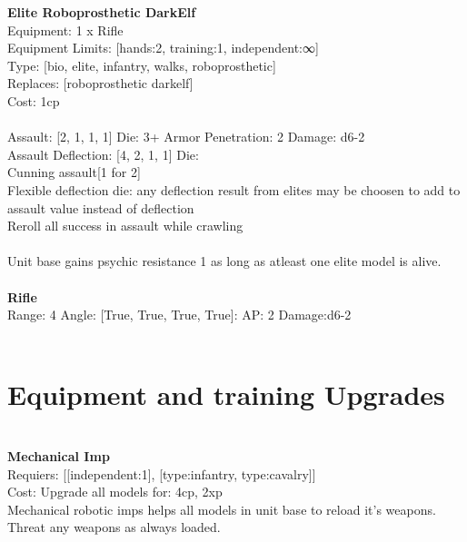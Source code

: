 {\bf Elite Roboprosthetic DarkElf } \\
Equipment: 1 x Rifle \\
Equipment Limits: [hands:2, training:1, independent:∞] \\
Type: [bio, elite, infantry, walks, roboprosthetic] \\
Replaces: [roboprosthetic darkelf] \\
Cost: 1cp\\
\ \\
Assault: [2, 1, 1, 1] Die: 3+ Armor Penetration: 2 Damage: d6-2 \\
Assault Deflection: [4, 2, 1, 1] Die: \\
\indent Cunning assault[1 for 2]\\ 
Flexible deflection die: any deflection result from elites may be choosen to add to assault value instead of deflection\\ 
Reroll all success in assault while crawling\\ 
 
\ \\
Unit base gains psychic resistance 1 as long as atleast one elite model is alive.\\ 

\ \\
{\bf Rifle } \\



Range: 4  Angle: [True, True, True, True]: AP: 2 Damage:d6-2 \\




 
\ \\

\section{Equipment and training Upgrades}\ \\
{\bf Mechanical Imp } \\

Requiers: [[independent:1], [type:infantry, type:cavalry]] \\
Cost: Upgrade all models for: 4cp, 2xp \\
Mechanical robotic imps helps all models in unit base to reload it's weapons. Threat any weapons as always loaded.\\ 










